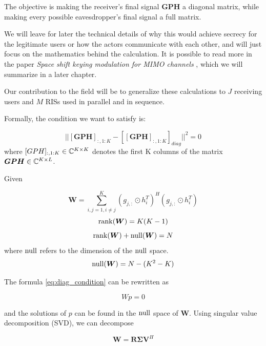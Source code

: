 The objective is making the receiver's final signal $\bm{GPH}$ a diagonal matrix, while making every possible eavesdropper's final signal a full matrix.

We will leave for later the technical details of why this would achieve secrecy for the legitimate users or how the actors communicate with each other, and will just focus on the mathematics behind the calculation. It is possible to read more in the paper \textit{Space shift keying modulation for MIMO channels} \cite{5165332}, which we will summarize in a later chapter.

Our contribution to the field will be to generalize these calculations to $J$ receiving users and $M$ RISs used in parallel and in sequence.

Formally, the condition we want to satisfy is:

\begin{equation}
  || [\bm{GPH}]_{:,1:K} - [[\bm{GPH}]_{:,1:K}]_{diag} || ^2 = 0
  \label{eq:diag_condition}
\end{equation}
where $[GPH]_{:,1:K} \in \mathbb{C}^{K \times K}$ denotes the first K columns of the matrix $\bm{GPH} \in \mathbb{C}^{K \times L}$.

Given

\begin{equation}
  \bm{W} = \sum_{i,j = 1, i \ne j}^{K} (g_{j,:} \odot h_i^T)^H (g_{j,:} \odot h_i^T)
\end{equation}
\begin{equation}
  \operatorname{rank}(\bm{W}) = K(K-1)
\end{equation}
\begin{equation}
  \operatorname{rank}(\bm{W}) + \operatorname{null}(\bm{W}) = N
\end{equation}
where $\operatorname{null}$ refers to the dimension of the $\operatorname{null}$ space.
\begin{equation}
  \operatorname{null}(\bm{W}) = N - (K^2 - K)
\end{equation}

The formula \eqref{eq:diag_condition} can be rewritten as

\begin{equation}Wp = 0\end{equation}

and the solutions of $p$ can be found in the $\operatorname{null}$ space of $\bm{W}$. Using singular value decomposition (SVD), we can decompose

\begin{equation}
  \bm{W} = \bm{R \Sigma V}^H
\end{equation}

